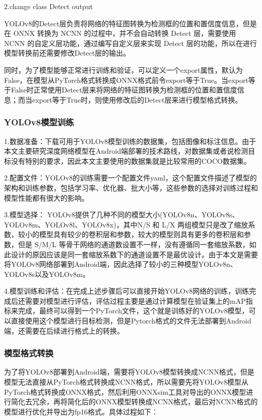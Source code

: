 \documentclass{ctexart}
\numberwithin{equation}{section}%
\numberwithin{figure}{section}%
\numberwithin{table}{section}%
\begin{document}
	2.change class Detect output
	
	YOLOv8的Detect层负责将网络的特征图转换为检测框的位置和置信度信息，但是在 ONNX 转换为 NCNN 的过程中，并不会自动转换 Detect 层，需要使用 NCNN 的自定义层功能，通过编写自定义层来实现 Detect 层的功能，所以在进行模型转换前还需要修改Detect层的输出。

	同时，为了模型能够正常进行训练和验证，可以定义一个export属性，默认为False，在模型从PyTorch格式转换成ONNX格式前令export等于True。当export等于False时正常使用Detect层来将网络的特征图转换为检测框的位置和置信度信息；而当export等于True时，则使用修改后的Detect层来进行模型格式转换。
	
	\subsubsection{YOLOv8模型训练}	
	1.数据准备：下载可用于YOLOv8模型训练的数据集，包括图像和标注信息。由于本文主要研究深度网络模型在Android端部署的技术路线，对数据集或者说检测目标没有特别的要求，因此本文主要使用的数据集就是比较常用的COCO数据集。

	2.配置文件：YOLOv8的训练需要一个配置文件yaml，这个配置文件描述了模型的架构和训练参数，包括学习率、优化器、批大小等，这些参数的选择对训练过程和模型性能都有很大的影响。
	
	3.模型选择：
	YOLOv8提供了几种不同的模型大小(YOLOv8n、YOLOv8s、YOLOv8m、YOLOv8l、YOLOv8x)，其中N/S 和 L/X 两组模型只是改了缩放系数，较小的模型具有较少的卷积层和参数，较大的模型则具有更多的卷积层和参数，但是 S/M/L 等骨干网络的通道数设置不一样，没有遵循同一套缩放系数，如此设计的原因应该是同一套缩放系数下的通道设置不是最优设计。由于本文是需要将YOLOv8网络部署到Android端，因此选择了较小的三种模型YOLOv8n、YOLOv8s以及YOLOv8m。
	
	4.模型训练和评估：在完成上述步骤后可以直接开始YOLOv8网络的训练，训练完成后还需要对模型进行评估，评估过程主要是通过计算模型在验证集上的mAP指标来完成，最终可以得到一个PyTorch文件，这个就是训练好的YOLOv8模型，可以直接使用这个模型进行目标检测，但是Pytorch格式的文件无法部署到Android端，还需要在后续进行格式上的转换。
	
	\subsubsection{模型格式转换}
	为了将YOLOv8部署到Android端，需要将YOLOv8模型转换成NCNN格式，但是模型无法直接从PyTorch格式转换成NCNN格式，所以需要先将YOLOv8模型从PyTorch格式转换成ONNX格式，然后利用ONNXsim工具对导出的ONNX模型进行简化去冗余，再将简化后的ONNX模型转换成NCNN格式，最后对NCNN格式的模型进行优化并导出为fp16格式。具体过程如下：
	
\end{document}
